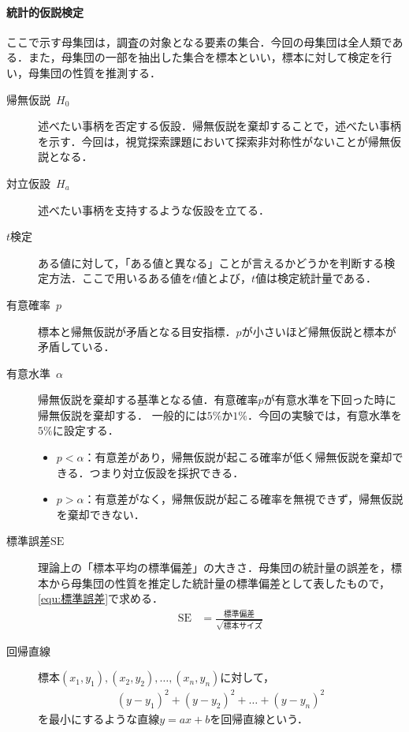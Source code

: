 \paragraph{統計的仮説検定}
ここで示す母集団は，調査の対象となる要素の集合．今回の母集団は全人類である．また，母集団の一部を抽出した集合を標本といい，標本に対して検定を行い，母集団の性質を推測する．
\begin{framed}
    \begin{description}
        \item[帰無仮説\ \(H_0\)] 述べたい事柄を否定する仮設．帰無仮説を棄却することで，述べたい事柄を示す．今回は，視覚探索課題において探索非対称性がないことが帰無仮説となる．
        \item[対立仮設\ \(H_a\)] 述べたい事柄を支持するような仮設を立てる．
        \item[\(t\)検定] ある値に対して，「ある値と異なる」ことが言えるかどうかを判断する検定方法．ここで用いるある値を\(t\)値とよび，\(t\)値は検定統計量である．
        \item[有意確率\ \(p\)] 標本と帰無仮説が矛盾となる目安指標．\(p\)が小さいほど帰無仮説と標本が矛盾している．
        \item[有意水準\ \(\alpha\)] 帰無仮説を棄却する基準となる値．有意確率\(p\)が有意水準を下回った時に帰無仮説を棄却する．
            一般的には\(5\%\)か\(1\%\)．今回の実験では，有意水準を\(5\%\)に設定する．
            \begin{itemize}
                \item \(p<\alpha\)：有意差があり，帰無仮説が起こる確率が低く帰無仮説を棄却できる．つまり対立仮設を採択できる．
                \item \(p>\alpha\)：有意差がなく，帰無仮説が起こる確率を無視できず，帰無仮説を棄却できない．
            \end{itemize}
        \item[標準誤差\(\textrm{SE}\)] 理論上の「標本平均の標準偏差」の大きさ．母集団の統計量の誤差を，標本から母集団の性質を推定した統計量の標準偏差として表したもので，\eqref{equ:標準誤差}で求める．
            \begin{align}
                \textrm{SE} & =\frac{\textrm{標準偏差}}{\sqrt{標本サイズ}}\label{equ:標準誤差}
            \end{align}
            \item[回帰直線]標本\((x_1,y_1),(x_2,y_2),\dots ,(x_n,y_n)\)に対して，
            \begin{align*}
                (y-y_1)^2+(y-y_2)^2+\dots +(y-y_n)^2
            \end{align*}
            を最小にするような直線\(y=ax+b\)を回帰直線という．
    \end{description}
    \hfill\cite[p.168, p.200\ -\ p.205]{Pythonで学ぶあたらしい統計学の教科書}
\end{framed}